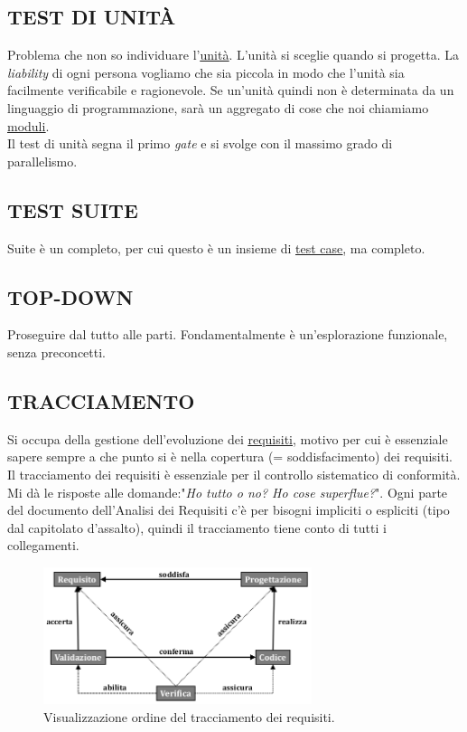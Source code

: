 		\subsection{TEST DI UNITÀ}		\label{testunita}
		Problema che non so individuare l'\underline{\hyperref[unita]{unità}}. L'unità si sceglie quando si progetta. La \textit{liability} di ogni persona vogliamo che sia piccola in modo che l'unità sia facilmente verificabile e ragionevole. Se un'unità quindi non è determinata da un linguaggio di programmazione, sarà un aggregato di cose che noi chiamiamo \underline{\hyperref[moduli]{moduli}}.	\\
		Il test di unità segna il primo \textit{gate} e si svolge con il massimo grado di parallelismo.


		\subsection{TEST SUITE}		\label{testsuite}
		Suite è un completo, per cui questo è un insieme di \underline{\hyperref[testcase]{test case}}, ma completo.


		\subsection{TOP-DOWN}	 \label{topdown}
		Proseguire dal tutto alle parti. Fondamentalmente è un'esplorazione funzionale, senza preconcetti.


		\subsection{TRACCIAMENTO}  \label{tracciamento}
		Si occupa della gestione dell'evoluzione dei \underline{\hyperref[requirements]{requisiti}}, motivo per cui è essenziale sapere sempre a che punto si è nella copertura (= soddisfacimento) dei requisiti. Il tracciamento dei requisiti è essenziale per il controllo sistematico di conformità. Mi dà le risposte alle domande:"\textit{Ho tutto o no? Ho cose superflue?}". Ogni parte del documento dell'Analisi dei Requisiti c'è per bisogni impliciti o espliciti (tipo dal capitolato d'assalto), quindi il tracciamento tiene conto di tutti i collegamenti.

		\begin{figure}[H]
			\centering
			\includegraphics[width=0.7\textwidth]{img/trac}
			\caption{Visualizzazione ordine del tracciamento dei requisiti.}
		\end{figure}

